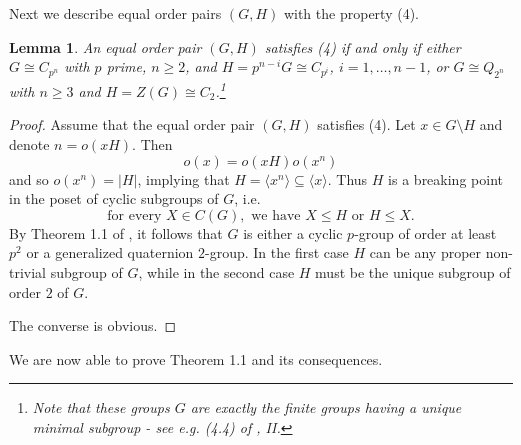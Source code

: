 \documentclass[12pt]{article}
\newtheorem{lemma}[theorem]{Lemma}
\newcommand{\0}{{\leqno}}
\begin{document}
Next we describe equal order pairs $(G,H)$ with the property (4). 

\begin{lemma}
An equal order pair $(G,H)$ satisfies (4) if and only if either $G\cong C_{p^n}$ with $p$ prime, $n\geq 2$, and $H=p^{n-i}G\cong C_{p^i}$, $i=1,\dots,n-1$, or $G\cong Q_{2^n}$ with $n\geq 3$ and $H=Z(G)\cong C_2$.\footnote{Note that these groups $G$ are exactly the finite groups having a unique minimal subgroup - see e.g. (4.4) of \cite{18}, II.}
\end{lemma}
\begin{proof}
Assume that the equal order pair $(G,H)$ satisfies (4). Let $x\in G\setminus H$ and denote $n=o(xH)$. Then 
\begin{equation}
o(x)=o(xH)o(x^n)\nonumber
\end{equation}and so $o(x^n)=|H|$, implying that $H=\langle x^n\rangle\subseteq\langle x\rangle$. Thus $H$ is a breaking point in the poset of cyclic subgroups of $G$, i.e. 
\begin{equation}
\mbox{for every } X\in C(G), \mbox{ we have } X\leq H \mbox{ or } H\leq X.\nonumber
\end{equation}By Theorem 1.1 of \cite{19}, it follows that $G$ is either a cyclic $p$-group of order at least $p^2$ or a generalized quaternion $2$-group. In the first case $H$ can be any proper non-trivial subgroup of $G$, while in the second case $H$ must be the unique subgroup of order $2$ of $G$.

The converse is obvious.
\end{proof}

We are now able to prove Theorem 1.1 and its consequences.
\end{document}
